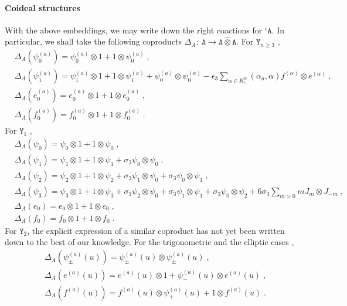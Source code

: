\documentclass[11pt]{article}
\numberwithin{equation}{section}
\numberwithin{figure}{section}
\numberwithin{table}{section}
\begin{document}
\paragraph{Coideal structures} With the above embeddings, we may write down the right coactions for ${}^\iota\mathtt{A}$. In particular, we shall take the following coproducts $\Delta_A:~\mathtt{A}\rightarrow\mathtt{A}\widehat{\otimes}\mathtt{A}$. For $\mathtt{Y}_{n\geq3}$ \cite{guay2018coproduct},
\begin{subequations}
	\begin{align}
		&\Delta_A\left(\psi^{(a)}_0\right)=\psi^{(a)}_0\otimes1+1\otimes\psi^{(a)}_0\;,\\
		&\Delta_A\left(\psi^{(a)}_1\right)=\psi^{(a)}_1\otimes1+1\otimes\psi^{(a)}_1+\psi^{(a)}_0\otimes\psi^{(a)}_0-\epsilon_3\sum_{\alpha\in R^\text{re}_+}(\alpha_a,\alpha)f^{(\alpha)}\otimes e^{(\alpha)}\;,\\
		&\Delta_A\left(e^{(a)}_0\right)=e^{(a)}_0\otimes1+1\otimes e^{(a)}_0\;,\\
		&\Delta_A\left(f^{(a)}_0\right)=f^{(a)}_0\otimes1+1\otimes f^{(a)}_0\;.
	\end{align}
\end{subequations}
For $\mathtt{Y}_1$ \cite{schiffmann2013cherednik,Prochazka:2015deb},
\begin{subequations}
	\begin{align}
		&\Delta_A(\psi_0)=\psi_0\otimes1+1\otimes\psi_0\;,\\
		&\Delta_A(\psi_1)=\psi_1\otimes1+1\otimes\psi_1+\sigma_3\psi_0\otimes\psi_0\;,\\
		&\Delta_A(\psi_2)=\psi_2\otimes1+1\otimes\psi_2+\sigma_3\psi_1\otimes\psi_0+\sigma_3\psi_0\otimes\psi_1\;,\\
		&\Delta_A(\psi_3)=\psi_3\otimes1+1\otimes\psi_3+\sigma_3\psi_2\otimes\psi_0+\sigma_3\psi_1\otimes\psi_1+\sigma_3\psi_0\otimes\psi_2+6\sigma_3\sum_{m>0}mJ_m\otimes J_{-m}\;,\\
		&\Delta_A(e_0)=e_0\otimes1+1\otimes e_0\;,\\
		&\Delta_A(f_0)=f_0\otimes1+1\otimes f_0\;.
	\end{align}
\end{subequations}
For $\mathtt{Y}_2$, the explicit expression of a similar coproduct has not yet been written down to the best of our knowledge. For the trigonometric and the elliptic cases \cite{Noshita:2021ldl,Galakhov:2021vbo},
\begin{subequations}
	\begin{align}
		&\Delta_A\left(\psi_\pm^{(a)}(u)\right)=\psi_\pm^{(a)}(u)\otimes\psi_\pm^{(a)}(u)\;,\\
		&\Delta_A\left(e^{(a)}(u)\right)=e^{(a)}(u)\otimes1+\psi^{(a)}_-(u)\otimes e^{(a)}(u)\;,\\
		&\Delta_A\left(f^{(a)}(u)\right)=f^{(a)}(u)\otimes\psi_+^{(a)}(u)+1\otimes f^{(a)}(u)\;.
	\end{align}
\end{subequations}
\end{document}

